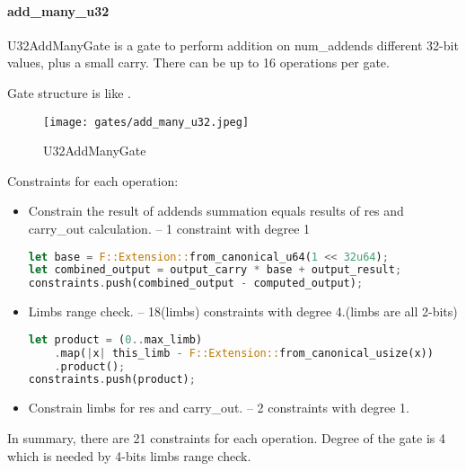 \paragraph{add\_many\_u32}

U32AddManyGate is a gate to perform addition on num\_addends different 32-bit values, plus a small carry. 
There can be up to 16 operations per gate.

Gate structure is like .

\begin{figure}[!ht]
    \centering
    \texttt{[image: gates/add\_many\_u32.jpeg]}
    \caption{U32AddManyGate}
    \label{fig:add-many-u32}
\end{figure}

Constraints for each operation:
\begin{itemize}
    \item Constrain the result of addends summation equals results of res and carry\_out calculation. -- 1 constraint with degree 1
    \begin{lstlisting}[language=rust]
let base = F::Extension::from_canonical_u64(1 << 32u64);
let combined_output = output_carry * base + output_result;
constraints.push(combined_output - computed_output);
    \end{lstlisting}
    \item Limbs range check. -- 18(limbs) constraints with degree 4.(limbs are all 2-bits)
    \begin{lstlisting}[language=rust]
let product = (0..max_limb)
    .map(|x| this_limb - F::Extension::from_canonical_usize(x))
    .product();
constraints.push(product);
    \end{lstlisting}
    \item Constrain limbs for res and carry\_out. -- 2 constraints with degree 1.
\end{itemize}

In summary, there are 21 constraints for each operation. Degree of the gate is 4 which is needed by 4-bits limbs range check.
